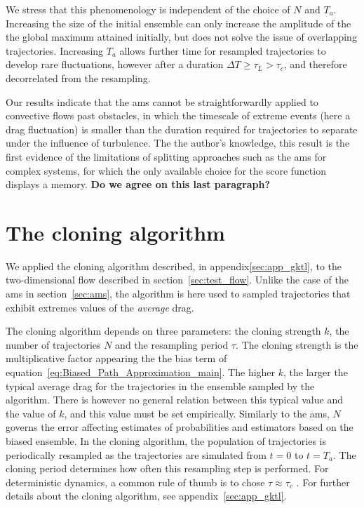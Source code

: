 \documentclass{jfm}
\begin{document}
We stress that this phenomenology is independent of the choice of $N$ and $T_a$.
Increasing the size of the initial ensemble can only increase the amplitude of the the global maximum attained initially, but does not solve the issue of overlapping trajectories.
Increasing $T_a$ allows further time for resampled trajectories to develop rare fluctuations, however after a duration $\Delta T \geq \tau_L > \tau_c$, and therefore decorrelated from the resampling.

Our results indicate that the \ac{ams} cannot be straightforwardly applied to convective flows past obstacles,
in which the timescale of extreme events (here a drag fluctuation) is smaller than the duration required
for trajectories to separate under the influence of turbulence.
The the author's knowledge, this result is the first evidence of the limitations of splitting approaches such as the \ac{ams} for complex systems, for which the only available choice for the score function displays a memory. \textbf{Do we agree on this last paragraph?}

\section{The cloning algorithm}
\label{sec:cloning}
We applied the cloning algorithm described, in appendix\ref{sec:app_gktl}, to the two-dimensional flow described in section~\ref{sec:test_flow}.
Unlike the case of the \ac{ams} in section~\ref{sec:ams}, the algorithm is here used to sampled trajectories that exhibit extremes values of
the \emph{average} drag.

The cloning algorithm depends on three parameters: the cloning strength $k$, the number of trajectories $N$ and the resampling period $\tau$.
The cloning strength is the multiplicative factor appearing the the bias term of equation~\eqref{eq:Biased_Path_Approximation_main}.
The higher $k$, the larger the typical average drag for the trajectories in the ensemble sampled by the algorithm.
There is however no general relation between this typical value and the value of $k$, and this value must be set empirically.
Similarly to the \ac{ams}, $N$ governs the error affecting estimates of probabilities and estimators based on the biased ensemble.
In the cloning algorithm, the population of trajectories is periodically resampled as the trajectories are simulated from $t=0$ to
$t=T_a$.
The cloning period determines how often this resampling step is performed.
For deterministic dynamics, a common rule of thumb is to chose $\tau \approx \tau_c$ \citep{giardina_direct_2006}.
For further details about the cloning algorithm, see appendix~\ref{sec:app_gktl}.
\end{document}
